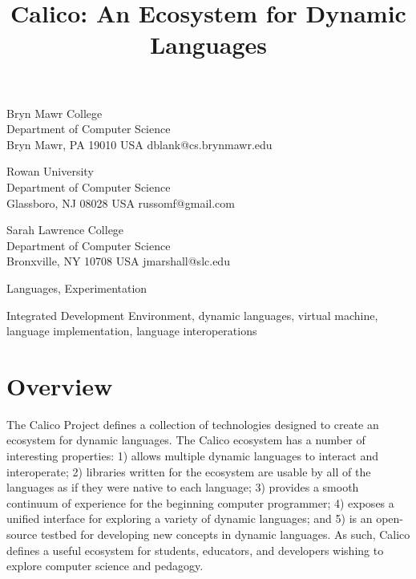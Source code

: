 \documentclass[preprint]{sigplanconf}
\begin{document}




\title{Calico: An Ecosystem for Dynamic Languages}

           {Bryn Mawr College\\Department of Computer Science\\Bryn Mawr, PA 19010 USA}
           {dblank@cs.brynmawr.edu}

           {Rowan University\\Department of Computer Science\\Glassboro, NJ 08028 USA}
           {russomf@gmail.com}

           {Sarah Lawrence College\\Department of Computer Science\\Bronxville, NY 10708 USA}
           {jmarshall@slc.edu}

\maketitle

\begin{abstract}

\end{abstract}


\terms
Languages, Experimentation

\keywords 
Integrated Development Environment, dynamic languages,
virtual machine, language implementation, language interoperations

\section{Overview}

The Calico Project defines a collection of technologies designed to
create an ecosystem for dynamic languages. The Calico ecosystem has a
number of interesting properties: 1) allows multiple dynamic languages
to interact and interoperate; 2) libraries written for the ecosystem
are usable by all of the languages as if they were native to each
language; 3) provides a smooth continuum of experience for the
beginning computer programmer; 4) exposes a unified interface for
exploring a variety of dynamic languages; and 5) is an open-source
testbed for developing new concepts in dynamic languages. As such,
Calico defines a useful ecosystem for students, educators, and
developers wishing to explore computer science and pedagogy.
\end{document}
